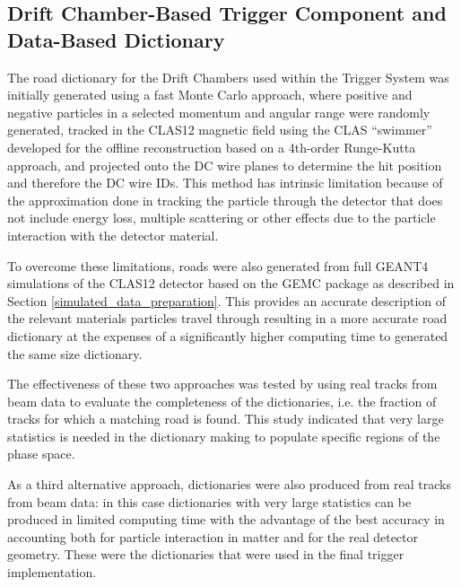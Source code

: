 
\subsection{Drift Chamber-Based Trigger Component and Data-Based Dictionary}

The road dictionary for the Drift Chambers used within the Trigger System was initially generated using a fast Monte Carlo approach, where positive and negative particles in a selected momentum and angular range were randomly generated, tracked in the CLAS12 magnetic field using the CLAS ``swimmer'' developed for the offline reconstruction based on a 4th-order Runge-Kutta approach, and projected onto the DC wire planes to determine the hit position and therefore the DC wire IDs. This method has intrinsic limitation because of the approximation done in tracking the particle through the detector that does not include energy loss, multiple scattering or other effects due to the particle interaction with the detector material.

To overcome these limitations, roads were also generated from full GEANT4 simulations of the CLAS12 detector based on the GEMC package as described in Section \ref{simulated_data_preparation}. This provides an accurate description of the relevant materials particles travel through resulting in a more accurate road dictionary at the expenses of a significantly higher computing time to generated the same size dictionary.

The effectiveness of these two approaches was tested by using real tracks from beam data to evaluate the completeness of the dictionaries, i.e. the fraction of tracks for which a matching road is found. This study indicated that very large statistics is needed in the dictionary making to populate specific regions of the phase space.

As a third alternative approach, dictionaries were also produced from real tracks from beam data: in this case dictionaries with very large statistics can be produced in limited computing time with the advantage of the best accuracy in accounting both for particle interaction in matter and for the real detector geometry. These were the dictionaries that were used in the final trigger implementation.


